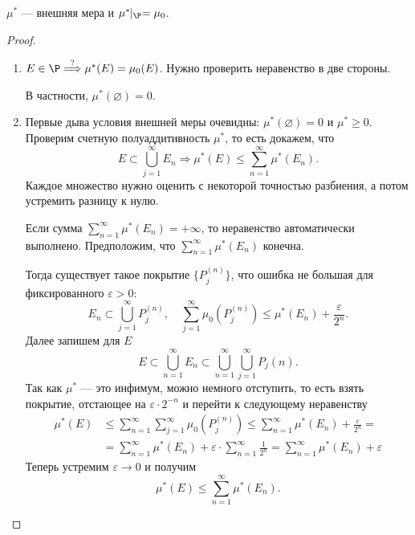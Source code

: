 \begin{thm}
	$ \mu ^{*}$ --- внешняя мера и  $ \mu ^{*}\!\!\mid_{\P} = \mu_0$.
\end{thm}
\begin{proof}
	$ $
    \begin{enumerate}
		\item $ E \in \P \stackrel{?}{ \Longrightarrow } \mu ^{*} (E) = \mu _0(E)$. Нужно проверить неравенство в две стороны.
			$ $
			В частности, $ \mu ^{*}(\varnothing) = 0$.
		\item Первые дыва условия внешней меры очевидны: $ \mu^{*} (\varnothing) = 0$ и $ \mu^{*} \ge 0$. Проверим счетную полуаддитивность $ \mu ^{*}$, то есть докажем, что
			\[
				E \subset \bigcup_{j=1}^{\infty} E_n \Longrightarrow \mu ^{*}(E)  \le \sum_{n=1}^{\infty} \mu ^{*}(E_n)
			.\] 
			Каждое множество нужно оценить с некоторой точностью разбиения, а потом устремить разницу к нулю.

			Если сумма $ \sum_{n=1}^{\infty} \mu ^{*}(E_n) = +\infty$, то неравенство автоматически выполнено. Предположим, что $ \sum_{n=1}^{\infty} \mu ^{*}(E_n) $ конечна.

			Тогда существует такое покрытие $ \{P_j^{(n)}\}$, что ошибка не большая для фиксированного $ \varepsilon > 0$:
			\[
				E_n \subset \bigcup_{j=1}^{\infty} P_j^{(n)}, \quad \sum_{j=1}^{\infty} \mu _0(P_{j}^{(n)}) \le \mu ^{*} (E_n) + \frac{\varepsilon }{2^{n}}
			.\] 
			Далее запишем для $ E$ 
			\[
				E \subset \bigcup_{n=1}^{\infty} E_n \subset \bigcup_{n=1}^{\infty} \bigcup_{j=1}^{\infty} P_j(n)
			.\] 
			Так как $ \mu ^{*}$ --- это инфимум, можно немного отступить, то есть взять покрытие, отстающее на  $ \varepsilon \cdot 2^{-n}$ и перейти к следующему неравенству
			\[
				\begin{aligned}
					\mu ^{*} (E) &\le \sum_{n=1}^{\infty} \sum_{j=1}^{\infty} \mu _{0}(P_j^{(n)}) \le \sum_{n=1}^{\infty} \mu ^{*}(E_n) + \frac{\varepsilon}{2^{n}} = \\
								 &=\sum_{n=1}^{\infty} \mu ^{*}(E_n) + \varepsilon \cdot \sum_{n=1}^{\infty} \frac{1}{2^{n}} = \sum_{n=1}^{\infty} \mu ^{*}(E_n) + \varepsilon 
				\end{aligned}
			\] 
			Теперь устремим $ \varepsilon \to  0$ и получим
			\[
				\mu ^{*} (E) \le \sum_{n=1}^{\infty} \mu ^{*}(E_n)
			.\] 
    \end{enumerate} 
\end{proof}

